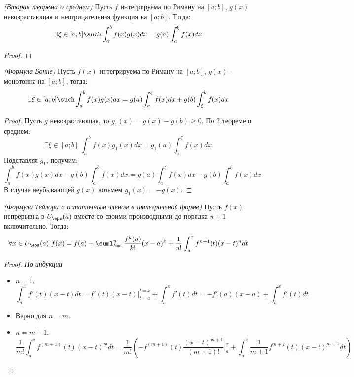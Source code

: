 \begin{theorem} \textit{(Вторая теорема о среднем)}
	Пусть $f$ интегрируема по Риману на $[a;b]$, $g(x)$ невозрастающая и неотрицательная функция на $[a;b]$. Тогда:
	\[
		\exists \xi \in [a;b] \such \int_a^bf(x)g(x)dx = g(a)\int_a^\xi f(x)dx
	\]
\end{theorem}


\begin{proof}
\end{proof}


\begin{corollary} \textit{(Формула Бонне)}
	Пусть $f(x)$  интегрируема по Риману на $[a;b]$, $g(x)$ - монотонна на $[a;b]$, тогда:
	\[
		\exists \xi \in [a;b] \such \int_a^bf(x)g(x)dx = g(a)\int_a^\xi f(x)dx + g(b)\int_\xi^bf(x)dx
	\]
\end{corollary}

\begin{proof}
	Пусть $g$  невозрастающая, то $g_1(x) = g(x) - g(b) \geq 0$. По 2 теореме о среднем:
	\[
		\exists \xi \in [a;b]\ \int_a^bf(x)g_1(x)dx = g_1(a)\int_a^\xi f(x)dx
	\]
	Подставляя $g_1$, получим:
	\[
		\int_a^bf(x)g(x)dx - g(b) \int_a^bf(x)dx = g(a)\int_a^\xi f(x)dx - g(b)\int_a^\xi f(x)dx
	\]
	В случае неубывающей $g(x)$ возьмем $g_1(x) = - g(x)$.
\end{proof}

\begin{theorem} \textit{(Формула Тейлора с остаточным членом в интегральной форме)}
	Пусть $f(x)$ непрерывна в $U_\eps(a)$ вместе со своими производными до порядка $n + 1$ включительно.
	Тогда:
	\[
		\forall x \in U_\eps(a)\ f(x) = f(a) + \suml_{k = 1}^n\frac{f^k(a)}{k!}(x - a)^k + \frac{1}{n!}\int_a^xf^{n + 1}(t)(x - t)^ndt
	\]
\end{theorem}

\begin{proof} \textit{По индукции}
	\begin{itemize}
		\item $n = 1$.
		\[
			\int_a^xf'(t)(x - t)dt = f'(t)(x - t) \Biggr |_{t = a}^{t = x} + \int_a^xf'(t)dt = - f'(a)(x - a) + \int_a^xf'(t)dt
		\]
		\item Верно для $n = m$.
		\item $n = m + 1$.
		\[
			\frac{1}{m!}\int_a^xf^{(m + 1)}(t)(x - t)^mdt = \frac{1}{m!}(-f^{(m + 1)}(t)\frac{(x - t)^{m + 1}}{(m + 1)!}\Biggr |_a^x + \int_a^x\frac{1}{m + 1}f^{m + 2}(t)(x - t)^{m + 1}dt)
		\]
		
	\end{itemize}
	
\end{proof}